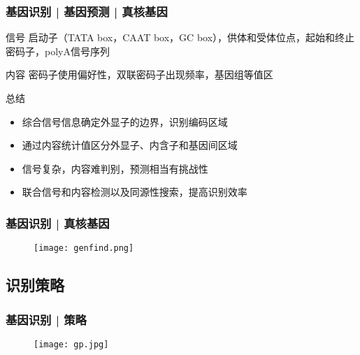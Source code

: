 \documentclass[table]{beamer}
\begin{document}
\begin{frame}
  \frametitle{基因识别 | 基因预测 | 真核基因}
  \begin{block}{信号}
    启动子（TATA box，CAAT box，GC box），供体和受体位点，起始和终止密码子，polyA信号序列
  \end{block}
  \begin{block}{内容}
    密码子使用偏好性，双联密码子出现频率，基因组等值区
  \end{block}
  \pause
  \begin{block}{总结}
    \begin{itemize}
      \item 综合信号信息确定外显子的边界，识别编码区域
      \item 通过内容统计值区分外显子、内含子和基因间区域
      \item 信号复杂，内容难判别，预测相当有挑战性
      \item 联合信号和内容检测以及同源性搜索，提高识别效率
    \end{itemize}
  \end{block}
\end{frame}

\begin{frame}
  \frametitle{基因识别 | 真核基因}
  \begin{figure}
    \centering
    \texttt{[image: genfind.png]}
  \end{figure}
\end{frame}

\subsection{识别策略}
\begin{frame}
  \frametitle{基因识别 | 策略}
  \begin{figure}
    \centering
    \texttt{[image: gp.jpg]}
  \end{figure}
\end{frame}
\end{document}
